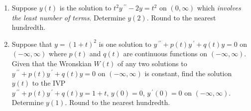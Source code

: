 \documentclass{ximera}
\begin{document}
\begin{enumerate}[label=(\arabic*)]








\begin{enumerate}[label=(\alph*)]
\item $v=t$
\item $v=-0.5e^{2t}$
\item $v=-e^{-t}$
\item $v=(t-1)e^t$
\item $v=-(t-1)e^t$ %
\item $v=-e^t$
\end{enumerate}



\item Suppose $y(t)$ is the solution to $t^2 y\,^{\prime\prime}-2y=t^2$ on $(0,\infty)$ which \emph{involves the least number of terms}.   Determine $y(2)$.   Round to the nearest hundredth.







\item Suppose that $y=(1+t)^2$ is one solution to $y\,^{\prime\prime}+p(t)y\,^{\prime}+q(t)y=0$ on $(-\infty,\infty)$ where $p(t)$ and $q(t)$ are continuous functions on $(-\infty,\infty)$.  Given that the Wronskian $W(t)$ of any two solutions to $y\,^{\prime\prime}+p(t)y\,^{\prime}+q(t)y=0$ on $(-\infty,\infty)$ is constant, find the solution $y(t)$ to the IVP \\$y\,^{\prime\prime}+p(t)y\,^{\prime}+q(t)y=1+t$, $y(0)=0$, $y\,^{\prime}(0)=0$ on $(-\infty,\infty)$.  Determine $y(1)$.  Round to the nearest hundredth.


\end{enumerate}
\end{document}
